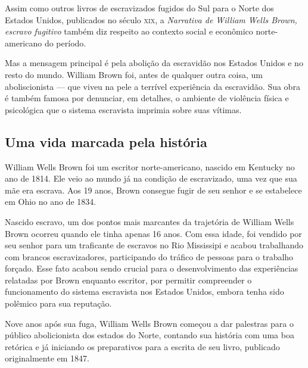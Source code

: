 \documentclass[12pt]{extarticle}
\begin{document}
Assim como outros livros de escravizados fugidos do Sul para o Norte dos
Estados Unidos, publicados no século \textsc{xix}, a \emph{Narrativa de William
Wells Brown, escravo fugitivo} também diz respeito ao contexto social e
econômico norte-americano do período.

Mas a mensagem principal é pela abolição da escravidão nos Estados Unidos
e no resto do mundo. William Brown foi, antes de qualquer outra coisa, um aboliscionista --- que viveu na pele a terrível experiência da escravidão. Sua obra é também famosa por denunciar, em detalhes, o ambiente de violência
física e psicológica que o sistema escravista imprimia sobre suas vítimas.


\subsection{Uma vida marcada pela história}

William Wells Brown foi um escritor norte-americano, nascido em
Kentucky no ano de 1814. Ele veio ao mundo já na condição de
escravizado, uma vez que sua mãe era escrava. Aos 19 anos, Brown
consegue fugir de seu senhor e se estabelece em Ohio no ano de 1834.

Nascido escravo, um dos pontos mais marcantes da trajetória de William
Wells Brown ocorreu quando ele tinha apenas 16 anos. Com essa idade, foi
vendido por seu senhor para um traficante de escravos no Rio Mississipi
e acabou trabalhando com brancos escravizadores, participando do tráfico
de pessoas para o trabalho forçado. Esse fato acabou sendo crucial para
o desenvolvimento das experiências relatadas por Brown enquanto
escritor, por permitir compreender o funcionamento do sistema escravista
nos Estados Unidos, embora tenha sido polêmico para sua reputação.

Nove anos após sua fuga, William Wells Brown começou a dar palestras
para o público abolicionista dos estados do Norte, contando sua história
com uma boa retórica e já iniciando os preparativos para a escrita de seu
livro, publicado originalmente em 1847.
\end{document}

